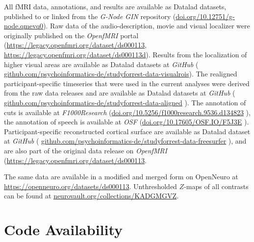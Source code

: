 \documentclass[english,11pt]{article}
\begin{document}

All fMRI data, annotations, and results are available as Datalad \citep{datalad}
datasets, published to or linked from the \emph{G-Node GIN} repository
(\href{https://doi.org/10.12751/g-node.qmevq0}{\url{doi.org/10.12751/g-node.qmevq0}}\citep{haeusler2021ppa}).
Raw data of the audio-description, movie and visual localizer were originally
published on the \emph{OpenfMRI} portal
(\url{https://legacy.openfmri.org/dataset/ds000113}\citep{Hanke2014ds000113},
\url{https://legacy.openfmri.org/dataset/ds000113d}\citep{hanke2016ds000113d}).
Results from the localization of higher visual areas are available as Datalad
datasets at \emph{GitHub} (
\href{https://github.com/psychoinformatics-de/studyforrest-data-visualrois}{\url{github.com/psychoinformatics-de/studyforrest-data-visualrois}}\citep{sengupta2016extensiondata}).
The realigned participant-specific timeseries that were used in the current
analyses were derived from the raw data releases and are available as Datalad
datasets at \emph{GitHub} (
\href{https://github.com/psychoinformatics-de/studyforrest-data-aligned}{\url{github.com/psychoinformatics-de/studyforrest-data-aligned}}
\citep{hanke2016aligned}).
The annotation of cuts is available at \emph{F1000Research}
(\href{https://doi.org/10.5256/f1000research.9536.d134823}{\url{doi.org/10.5256/f1000research.9536.d134823}}
\citep{haeusler2016cutdata}),
the annotation of speech is available at \emph{OSF}
(\href{https://doi.org/10.17605/OSF.IO/F5J3E}{\url{doi.org/10.17605/OSF.IO/F5J3E}}
\citep{haeusler2020speechdata}).
Participant-specific reconstructed cortical surface are available as Datalad
dataset at \emph{GitHub} (
\href{https://github.com/psychoinformatics-de/studyforrest-data-freesurfer}{\url{github.com/psychoinformatics-de/studyforrest-data-freesurfer}}
\citep{hanke2016freesurferdata}), and are also part of the original data release
on \emph{OpenfMRI}
(\url{https://legacy.openfmri.org/dataset/ds000113}\citep{Hanke2014ds000113}.

The same data are available in a modified and merged form on OpenNeuro at \url{https://openneuro.org/datasets/ds000113}.
Unthresholded $Z$-maps of all contrasts can be found at
\href{https://neurovault.org/collections/KADGMGVZ/}{\url{neurovault.org/collections/KADGMGVZ}}.


\section*{Code Availability}
\end{document}
